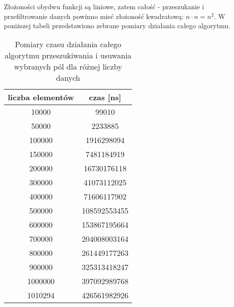 Złożoności obydwu funkcji są liniowe, zatem całość - przeszukanie i przefiltrowanie danych powinno mieć złożoność kwadratową: $n \cdot n=n^2$. W poniższej tabeli przedstawiono zebrane pomiary działania całego algorytmu. 

\begin{table}[H]
    \centering
    \caption{Pomiary czasu działania całego algorytmu przeszukiwania i usuwania wybranych pól dla różnej liczby danych}
    \begin{tabular}{|c|c|}
    \hline
    liczba elementów & czas [ns] \\ \hline
    10000            & 99010         \\ \hline
    50000            & 2233885       \\ \hline
    100000           & 1916298094    \\ \hline
    150000           & 7481184919    \\ \hline
    200000           & 16730176118   \\ \hline
    300000           & 41073112025   \\ \hline
    400000           & 71606117902   \\ \hline
    500000           & 108592553455  \\ \hline
    600000           & 153867195664  \\ \hline
    700000           & 204008003164  \\ \hline
    800000           & 261449177263  \\ \hline
    900000           & 325313418247  \\ \hline
    1000000          & 397092989768  \\ \hline
    1010294          & 426561982926  \\ \hline
    \end{tabular}
    \label{tab: zad1}
\end{table}


